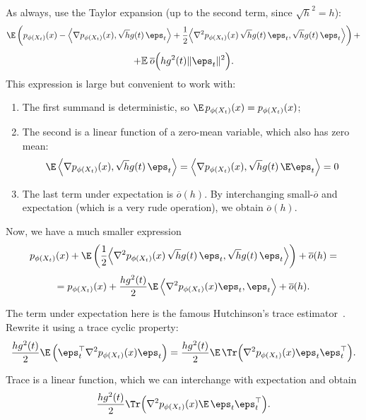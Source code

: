 As always, use the Taylor expansion (up to the second term, since $\sqrt{h}^2 = h$):
\[
    \E\left(p_{\phi(X_t)}(x) - \Big\langle \nabla p_{\phi(X_t)} (x), \sqrt{h} g(t)\, \eps_t  \Big\rangle + \frac{1}{2} \Big\langle \nabla^2 p_{\phi(X_t)}(x)\, \sqrt{h}g(t)\,\eps_t, \sqrt{h}g(t)\,\eps_t \Big \rangle \right) + 
\]
\[
    + \mathbb{E} \:\overline{o}\Big(h g^2(t) \|\eps_t \|^2\Big).
\]
This expression is large but convenient to work with:
\begin{enumerate}
    \item The first summand is deterministic, so $\E\, p_{\phi(X_t)}(x) = p_{\phi(X_t)}(x)$;
    \item The second is a linear function of a zero-mean variable, which also has zero mean:
    \[
        \E\, \Big\langle \nabla p_{\phi(X_t)} (x), \sqrt{h} g(t)\, \eps_t  \Big\rangle = \Big\langle \nabla p_{\phi(X_t)} (x), \sqrt{h} g(t)\, \E \eps_t  \Big\rangle = 0
    \]
    \item The last term under expectation is $\overline{o}(h)$. By interchanging small-$\overline{o}$ and expectation (which is a very rude operation), we obtain $\overline{o}(h)$.
\end{enumerate}

Now, we have a much smaller expression
\[
    p_{\phi(X_t)}(x) + \E\left(\frac{1}{2} \Big\langle \nabla^2 p_{\phi(X_t)}(x)\, \sqrt{h}g(t)\,\eps_t, \sqrt{h}g(t)\,\eps_t \Big \rangle \right) + \overline{o}(h) = 
\]
\[
    = p_{\phi(X_t)}(x) + \frac{h g^2(t)}{2} \E \,\Big\langle \nabla^2 p_{\phi(X_t)}(x) \eps_t, \eps_t \Big\rangle + \overline{o}(h).
\]

The term under expectation here is the famous Hutchinson's trace estimator~\cite{hutchinson1989stochastic}. Rewrite it using a trace cyclic property:
    \[
        \frac{h g^2(t)}{2} \E \, \Big(\eps_t^{\top} \nabla^2 p_{\phi(X_t)}(x) \eps_t \Big) = \frac{h g^2(t)}{2} \E\, \Tr \Big(\nabla^2 p_{\phi(X_t)}(x) \eps_t \eps_t^\top \Big).
    \]

Trace is a linear function, which we can interchange with expectation and obtain
\[
    \frac{h g^2(t)}{2} \Tr\Big(\nabla^2 p_{\phi(X_t)}(x) \E\, \eps_t \eps_t^\top \Big).
\]

